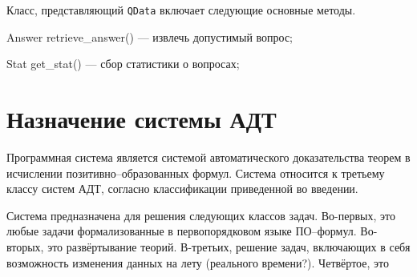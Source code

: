 Класс, представляющий \texttt{QData} включает следующие основные методы.
\begin{description}
  \item{Answer retrieve\_answer()} --- извлечь допустимый вопрос;
  \item{Stat get\_stat()} --- сбор статистики о вопросах;
\end{description}




\section{Назначение системы АДТ}
Программная система является системой автоматического доказательства теорем в исчислении позитивно--образованных формул. Система относится к третьему классу систем АДТ, согласно классификации приведенной во введении.

Система предназначена для решения следующих классов задач. Во-первых, это любые задачи формализованные в первопорядковом языке ПО--формул. Во-вторых, это развёртывание теорий. В-третьих, решение задач, включающих в себя возможность изменения данных на лету (реального времени?). Четвёртое, это



